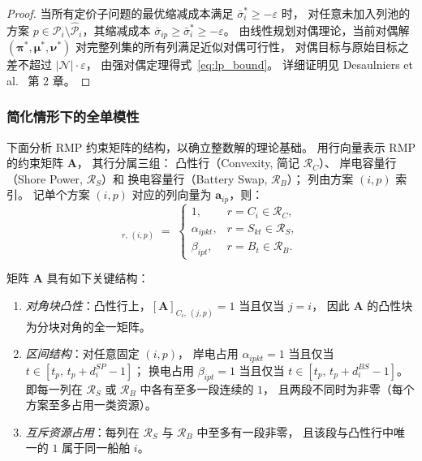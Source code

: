 \documentclass[UTF8, a4paper, 12pt]{ctexart}
\begin{document}
\begin{proof}
当所有定价子问题的最优缩减成本满足 $\bar{\sigma}_i^*\ge -\varepsilon$ 时，
对任意未加入列池的方案 $p\in\mathcal{P}_i\setminus\hat{\mathcal{P}}_i$，其缩减成本
$\bar{\sigma}_{ip}\ge\bar{\sigma}_i^*\ge -\varepsilon$。
由线性规划对偶理论，当前对偶解
$(\boldsymbol{\pi}^*,\boldsymbol{\mu}^*,\boldsymbol{\nu}^*)$
对完整列集的所有列满足近似对偶可行性，
对偶目标与原始目标之差不超过 $|\mathcal{N}|\cdot\varepsilon$，
由强对偶定理得式~\eqref{eq:lp_bound}。
详细证明见 Desaulniers et al.~\cite{Desaulniers2005} 第 2 章。
\end{proof}

\subsubsection{简化情形下的全单模性}

下面分析 RMP 约束矩阵的结构，以确立整数解的理论基础。
用行向量表示 RMP 的约束矩阵 $\mathbf{A}$，
其行分属三组：
凸性行（Convexity, 简记 $\mathcal{R}_C$）、
岸电容量行（Shore Power, $\mathcal{R}_S$）和
换电容量行（Battery Swap, $\mathcal{R}_B$）；
列由方案 $(i,p)$ 索引。
记单个方案 $(i,p)$ 对应的列向量为 $\mathbf{a}_{ip}$，则：
\begin{equation}
  [\mathbf{A}]_{r,\,(i,p)}
  \;=\;
  \begin{cases}
    1, & r = C_i\in\mathcal{R}_C, \\
    \alpha_{ipkt}, & r = S_{kt}\in\mathcal{R}_S, \\
    \beta_{ipt},   & r = B_{t}\in\mathcal{R}_B.
  \end{cases}
\end{equation}

矩阵 $\mathbf{A}$ 具有如下关键结构：
\begin{enumerate}[label=(\roman*)]
  \item \emph{对角块凸性}：凸性行上，$[\mathbf{A}]_{C_i,\,(j,p)}=1$ 当且仅当 $j=i$，
        因此 $\mathbf{A}$ 的凸性块为分块对角的全一矩阵。
  \item \emph{区间结构}：对任意固定 $(i,p)$，
        岸电占用 $\alpha_{ipkt}=1$ 当且仅当 $t\in[t_p,\,t_p+d_i^{SP}-1]$；
        换电占用 $\beta_{ipt}=1$ 当且仅当 $t\in[t_p,\,t_p+d_i^{BS}-1]$。
        即每一列在 $\mathcal{R}_S$ 或 $\mathcal{R}_B$ 中各有至多一段连续的 $1$，
        且两段不同时为非零（每个方案至多占用一类资源）。
  \item \emph{互斥资源占用}：每列在 $\mathcal{R}_S$ 与 $\mathcal{R}_B$ 中至多有一段非零，
        且该段与凸性行中唯一的 $1$ 属于同一船舶 $i$。
\end{enumerate}
\end{document}

